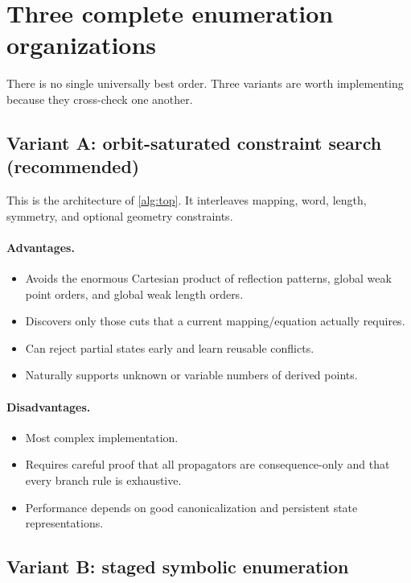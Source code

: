 \documentclass[11pt]{article}
\begin{document}
\section{Three complete enumeration organizations}
\label{sec:variants}

There is no single universally best order.  Three variants are worth implementing because they cross-check one another.

\subsection{Variant A: orbit-saturated constraint search (recommended)}

This is the architecture of \cref{alg:top}.  It interleaves mapping, word, length, symmetry, and optional geometry constraints.

\paragraph{Advantages.}
\begin{itemize}
  \item Avoids the enormous Cartesian product of reflection patterns, global weak point orders, and global weak length orders.
  \item Discovers only those cuts that a current mapping/equation actually requires.
  \item Can reject partial states early and learn reusable conflicts.
  \item Naturally supports unknown or variable numbers of derived points.
\end{itemize}

\paragraph{Disadvantages.}
\begin{itemize}
  \item Most complex implementation.
  \item Requires careful proof that all propagators are consequence-only and that every branch rule is exhaustive.
  \item Performance depends on good canonicalization and persistent state representations.
\end{itemize}

\subsection{Variant B: staged symbolic enumeration}
\end{document}
